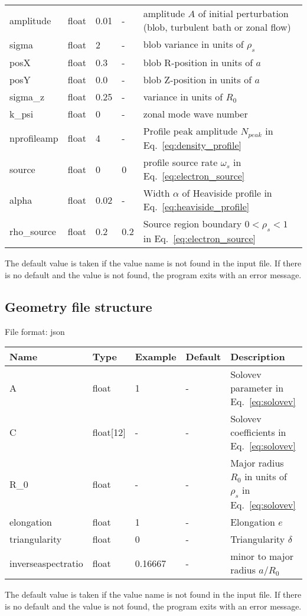 \begin{longtable}{llll>{\RaggedRight}p{6cm}}
\\
amplitude  & float &0.01   & - & amplitude $A$ of initial perturbation (blob, turbulent bath or zonal flow)  \\
sigma      & float &2      & - & blob variance in units of $\rho_s$ \\
posX       & float &0.3    & - & blob R-position in units of $a$\\
posY       & float &0.0    & - & blob Z-position in units of $a$ \\
sigma\_z    & float &0.25   & - & variance in units of $R_0$  \\
k\_psi     & float &0    & - & zonal mode wave number  \\
nprofileamp& float &4   & - & Profile peak amplitude $N_{peak}$ in Eq.~\eqref{eq:density_profile} \\
source  & float & 0     & 0 & profile source rate $\omega_s$ in Eq.~\eqref{eq:electron_source} \\
alpha     & float  & 0.02 & - & Width $\alpha$ of Heaviside profile in Eq.~\eqref{eq:heaviside_profile} \\
rho\_source & float  & 0.2   & 0.2 & Source region boundary $0<\rho_{s}<1$ in Eq.~\eqref{eq:electron_source}  \\
\bottomrule
\end{longtable}
The default value is taken if the value name is not found in the input file. If there is no default and
the value is not found,
the program exits with an error message.
\subsection{Geometry file structure}
File format: json

\begin{longtable}{llll>{\RaggedRight}p{7cm}}
\toprule
\rowcolor{gray!50}\textbf{Name} &  \textbf{Type} & \textbf{Example} & \textbf{Default} & \textbf{Description}  \\ \midrule
    A      & float & 1 &  - & Solovev parameter in Eq.~\eqref{eq:solovev} \\
    C      & float[12] &  - & - & Solovev coefficients in Eq.~\eqref{eq:solovev}  \\
    R\_0   & float & - & -  & Major radius $R_0$ in units of $\rho_s$ in Eq.~\eqref{eq:solovev} \\
    elongation    & float & 1 & - & Elongation $e$ \\
    triangularity & float & 0 & - & Triangularity $\delta$ \\
    inverseaspectratio & float & 0.16667 & - & minor to major radius $a/R_0$ \\
\bottomrule
\end{longtable}
The default value is taken if the value name is not found in the input file. If there is no default and
the value is not found,
the program exits with an error message.

